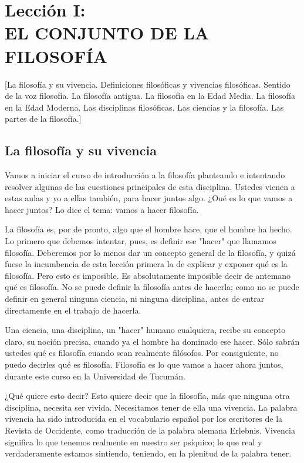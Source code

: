 \documentclass[10pt,letterpaper]{book}
\author{Manuel Garc\'{i}a Morente}
\begin{document}
\chapter*{Lecci\'{o}n I:\\EL CONJUNTO DE LA FILOSOF\'{I}A}
[La filosofía y su vivencia. Definiciones filosóficas y vivencias filosóficas. Sentido de la voz filosofía. La filosofía antigua. La filosofía en la Edad Media. La filosofía en la Edad Moderna. Las disciplinas filosóficas. Las ciencias y la filosofía. Las partes de la filosofía.]
\section*{La filosofía y su vivencia}
Vamos a iniciar el curso de introducción a la filosofía planteando e intentando resolver algunas de las cuestiones principales de esta disciplina. Ustedes vienen a estas aulas y yo a ellas también, para hacer juntos algo. ¿Oué es lo que vamos a hacer juntos? Lo dice el tema: vamos a hacer filosofía.

La filosofía es, por de pronto, algo que el hombre hace, que el hombre ha hecho. Lo primero que debemos intentar, pues, es definir ese "hacer" que llamamos filosofía. Deberemos por lo menos dar un concepto general de la filosofía, y quizá fuese la incumbencia de esta lección primera la de explicar y exponer qué es la filosofía. Pero esto es imposible. Es absolutamente imposible decir de antemano qué es filosofía. No se
puede definir la filosofía antes de hacerla; como no se puede definir en general ninguna ciencia, ni ninguna disciplina, antes de entrar directamente en el trabajo de hacerla.

Una ciencia, una disciplina, un "hacer" humano cualquiera, recibe su concepto claro, su noción precisa, cuando ya el hombre ha dominado ese hacer. Sólo sabrán ustedes qué es filosofía cuando sean realmente filósofos. Por consiguiente, no puedo decirles qué es filosofía. Filosofía es lo que vamos a hacer ahora juntos, durante este curso en la Universidad de Tucumán.

¿Qué quiere esto decir? Esto quiere decir que la filosofía, más que ninguna otra disciplina, necesita ser vivida. Necesitamos tener de ella una \guillemotleft vivencia\guillemotright. La palabra vivencia ha sido introducida en el vocabulario español por los escritores de la Revista de Occidente, como traducción de la palabra alemana \guillemotleft Erlebnis\guillemotright. Vivencia significa lo que tenemos realmente en nuestro ser psíquico; lo que real y verdaderamente estamos sintiendo, teniendo, en la plenitud de la palabra \guillemotleft tener\guillemotright.
\end{document}
